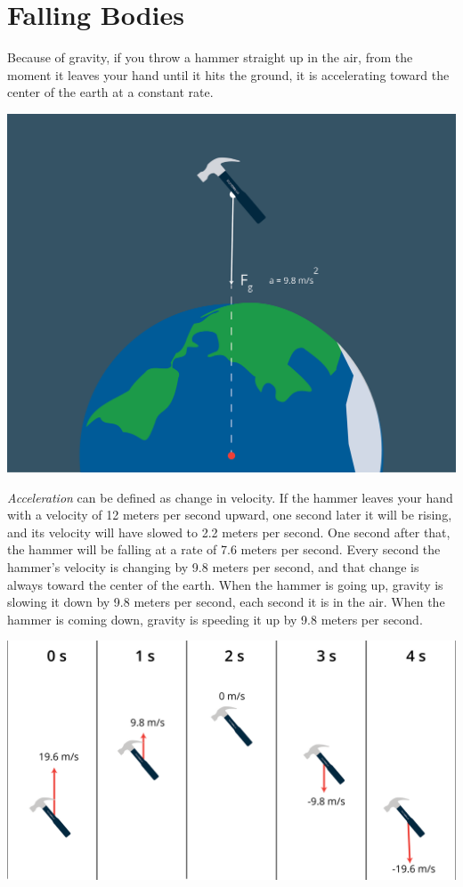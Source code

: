 \chapter{Falling Bodies}

Because of gravity, if you throw a hammer straight up in the air, from
the moment it leaves your hand until it hits the ground, it is
accelerating toward the center of the earth at a constant rate.

\includegraphics[width=1\textwidth]{hammerFall.png}

\emph{Acceleration} can be defined as change in velocity. If the hammer leaves your
hand with a velocity of 12 meters per second upward, one second later
it will be rising, and its velocity will have slowed to 2.2 meters per
second. One second after that, the hammer will be falling at a rate of
7.6 meters per second. Every second the hammer's velocity is changing by
9.8 meters per second, and that change is always toward the center of
the earth. When the hammer is going up, gravity is slowing it down by
9.8 meters per second, each second it is in the air.  When the hammer is coming down,
gravity is speeding it up by 9.8 meters per second.


\includegraphics[width=.8\textwidth]{hammerTime.png}

